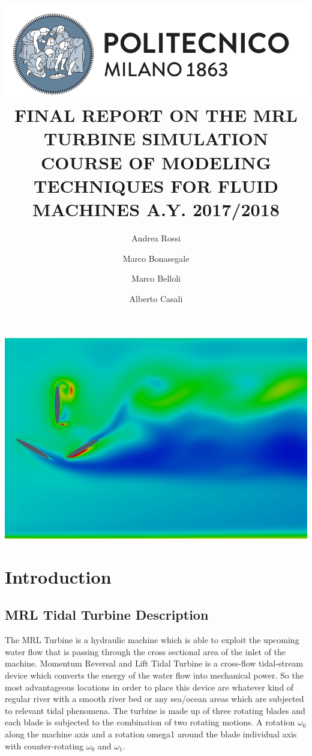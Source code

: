 \documentclass[a4paper,12pt]{article}
\title{
\includegraphics[scale=0.4]{images/logo.png}
\\[1cm]
FINAL REPORT ON THE  MRL TURBINE SIMULATION
COURSE OF MODELING TECHNIQUES FOR FLUID MACHINES 
A.Y. 2017/2018}
\author{
Andrea Rossi \and Marco Bonasegale
\and Marco Belloli \and Alberto Casali
}
\date{}
\begin{document}
\maketitle
\begin{center}
\includegraphics[width=\textwidth]{images/cover.png}
\end{center}

\newpage

\tableofcontents

\newpage

\section{Introduction}

\subsection{MRL Tidal Turbine Description}
The MRL Turbine is a hydraulic machine which is able to exploit the upcoming  water flow that is passing through the cross sectional area of the inlet of the machine. Momentum Reversal and Lift Tidal Turbine is a cross-flow tidal-stream device which converts the energy of the water
flow into mechanical power. So the most advantageous locations in order to place this device are whatever kind of regular river with a smooth river bed or any sea/ocean areas which are subjected to relevant tidal phenomena.
The turbine is made up of three rotating blades and each blade is subjected to the combination of two rotating motions. A rotation $\omega_0$ along the machine axis  and a rotation omega1 around the blade individual axis with counter-rotating $\omega_0$ and $\omega_1$.
\end{document}
